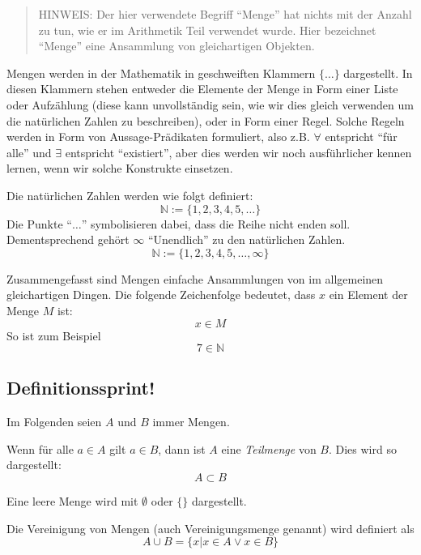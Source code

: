 \begin{quote}
HINWEIS: Der hier verwendete Begriff "`Menge"' hat nichts mit der Anzahl zu tun, wie er im Arithmetik Teil verwendet wurde. Hier bezeichnet "`Menge"' eine Ansammlung von gleichartigen Objekten.
\end{quote}

Mengen werden in der Mathematik in geschweiften Klammern $\{\dots \}$ dargestellt. In diesen Klammern stehen entweder die Elemente der Menge in Form einer Liste oder Aufzählung (diese kann unvollständig sein, wie wir dies gleich verwenden um die natürlichen Zahlen zu beschreiben), oder in Form einer Regel. Solche Regeln werden in Form von Aussage-Prädikaten formuliert, also z.B. $\forall$ entspricht "`für alle"' und $\exists$ entspricht "`existiert"', aber dies werden wir noch ausführlicher kennen lernen, wenn wir solche Konstrukte einsetzen. 

Die natürlichen Zahlen werden wie folgt definiert:
\[\mathbb{N} := \{ 1,2,3,4,5, \dots \} \]
Die Punkte "`$\dots$"' symbolisieren dabei, dass die Reihe nicht enden soll. Dementsprechend gehört $\infty$ "`Unendlich"' zu den natürlichen Zahlen.
\[\mathbb{N} := \{ 1,2,3,4,5, \dots, \infty \} \]

Zusammengefasst sind Mengen einfache Ansammlungen von im allgemeinen gleichartigen Dingen. Die folgende Zeichenfolge bedeutet, dass $x$ ein Element der Menge $M$ ist:
\[x \in M \]
So ist zum Beispiel
\[7 \in \mathbb{N} \]

\subsection{Definitionssprint!}
Im Folgenden seien $A$ und $B$ immer Mengen.

\begin{definition}
Wenn für alle $a\in A$ gilt $a\in B$, dann ist $A$ eine \textsl{Teilmenge} von $B$. Dies wird so dargestellt:
\[
A \subset B
\]
\end{definition}

\begin{definition}
Eine leere Menge wird mit $\emptyset$ oder $\{\}$ dargestellt.
\end{definition}

\begin{definition}
Die Vereinigung von Mengen (auch Vereinigungsmenge genannt) wird definiert als
\[A \cup B = \{ x | x\in A \vee x\in B \}\]
\end{definition}

